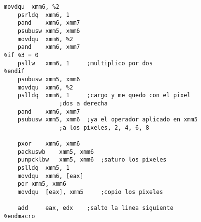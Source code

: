 \documentclass[11pt]{article}
\begin{document}
\begin{enumerate}
\begin{lstlisting}[frame=single]
	movdqu	xmm6, %2
	psrldq	xmm6, 1
	pand	xmm6, xmm7
	psubusw	xmm5, xmm6
	movdqu	xmm6, %2
	pand	xmm6, xmm7
%if %3 = 0
	psllw	xmm6, 1		;multiplico por dos
%endif	
	psubusw	xmm5, xmm6
	movdqu	xmm6, %2
	pslldq	xmm6, 1		;cargo y me quedo con el pixel 
				;dos a derecha
	pand	xmm6, xmm7
	psubusw	xmm5, xmm6	;ya el operador aplicado en xmm5 
				;a los pixeles, 2, 4, 6, 8

	pxor	xmm6, xmm6
	packuswb	xmm5, xmm6
	punpcklbw	xmm5, xmm6	;saturo los pixeles
	pslldq	xmm5, 1
	movdqu	xmm6, [eax]
	por	xmm5, xmm6
	movdqu	[eax], xmm5		;copio los pixeles

	add		eax, edx	;salto la linea siguiente
%endmacro

\end{lstlisting}
\end{enumerate}
\end{document}

